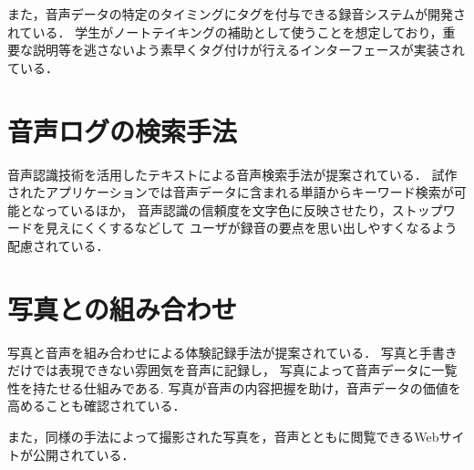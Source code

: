 また，音声データの特定のタイミングにタグを付与できる録音システムが開発されている\cite{Fujisaka}．
学生がノートテイキングの補助として使うことを想定しており，重要な説明等を逃さないよう素早くタグ付けが行えるインターフェースが実装されている．

\section{音声ログの検索手法}

音声認識技術を活用したテキストによる音声検索手法が提案されている\cite{Vemuri}．
試作されたアプリケーションでは音声データに含まれる単語からキーワード検索が可能となっているほか，
音声認識の信頼度を文字色に反映させたり，ストップワードを見えにくくするなどして
ユーザが録音の要点を思い出しやすくなるよう配慮されている．

\section{写真との組み合わせ}
写真と音声を組み合わせによる体験記録手法が提案されている\cite{Nakakura}．
写真と手書きだけでは表現できない雰囲気を音声に記録し，
写真によって音声データに一覧性を持たせる仕組みである.
写真が音声の内容把握を助け，音声データの価値を高めることも確認されている．

また，同様の手法によって撮影された写真を，音声とともに閲覧できるWebサイトが公開されている\cite{Masui}．

